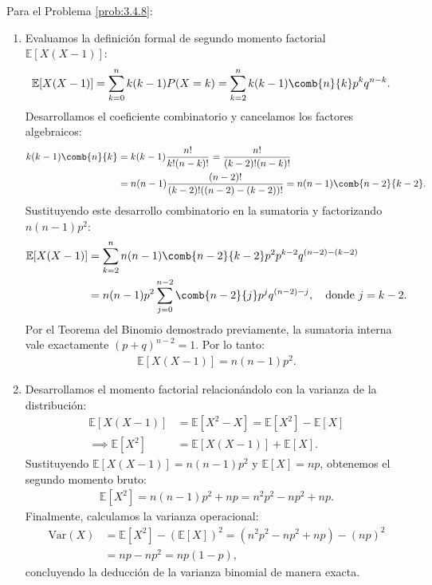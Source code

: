 \begin{solucion}
	\label{sol:3.4.8}
	Para el Problema \ref{prob:3.4.8}:
	\begin{enumerate}
		\item Evaluamos la definición formal de segundo momento factorial $\mathbb{E}[X(X-1)]$:
		\begin{align*}
			\mathbb{E}[X(X-1)] &= \sum_{k=0}^n k(k-1) P(X = k) = \sum_{k=2}^n k(k-1) \comb{n}{k} p^k q^{n-k}.
		\end{align*}
		Desarrollamos el coeficiente combinatorio y cancelamos los factores algebraicos:
		\begin{align*}
			k(k-1) \comb{n}{k} &= k(k-1) \dfrac{n!}{k!(n-k)!} = \dfrac{n!}{(k-2)!(n-k)!} \\
			&= n(n-1) \dfrac{(n-2)!}{(k-2)!((n-2)-(k-2))!} = n(n-1) \comb{n-2}{k-2}.
		\end{align*}
		Sustituyendo este desarrollo combinatorio en la sumatoria y factorizando $n(n-1)p^2$:
		\begin{align*}
			\mathbb{E}[X(X-1)] &= \sum_{k=2}^n n(n-1)\comb{n-2}{k-2} p^2 p^{k-2} q^{(n-2)-(k-2)} \\
			&= n(n-1)p^2 \sum_{j=0}^{n-2} \comb{n-2}{j} p^j q^{(n-2)-j}, \quad \text{donde } j = k-2.
		\end{align*}
		Por el Teorema del Binomio demostrado previamente, la sumatoria interna vale exactamente $(p+q)^{n-2} = 1$. Por lo tanto:
		\begin{align*}
			\mathbb{E}[X(X-1)] = n(n-1)p^2.
		\end{align*}
		\item Desarrollamos el momento factorial relacionándolo con la varianza de la distribución:
		\begin{align*}
			\mathbb{E}[X(X-1)] &= \mathbb{E}[X^2 - X] = \mathbb{E}[X^2] - \mathbb{E}[X] \\
			\implies \mathbb{E}[X^2] &= \mathbb{E}[X(X-1)] + \mathbb{E}[X].
		\end{align*}
		Sustituyendo $\mathbb{E}[X(X-1)] = n(n-1)p^2$ y $\mathbb{E}[X] = np$, obtenemos el segundo momento bruto:
		\begin{align*}
			\mathbb{E}[X^2] = n(n-1)p^2 + np = n^2 p^2 - np^2 + np.
		\end{align*}
		Finalmente, calculamos la varianza operacional:
		\begin{align*}
			\text{Var}(X) &= \mathbb{E}[X^2] - (\mathbb{E}[X])^2 = (n^2 p^2 - np^2 + np) - (np)^2 \\
			&= np - np^2 = np(1-p),
		\end{align*}
		concluyendo la deducción de la varianza binomial de manera exacta.
	\end{enumerate}
\end{solucion}

